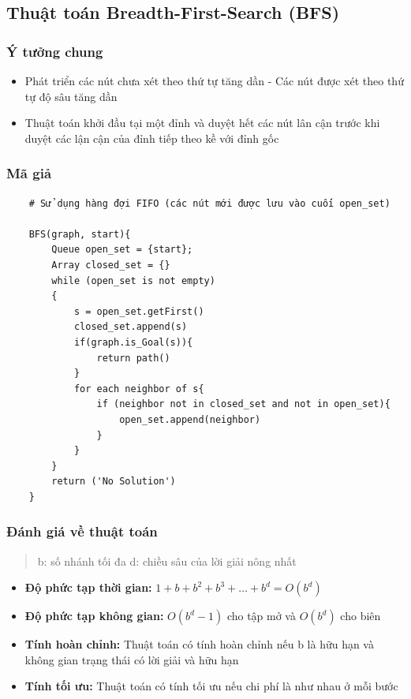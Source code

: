 \documentclass{article}
\begin{document}

\subsection{Thuật toán Breadth-First-Search (BFS)}
\subsubsection{Ý tưởng chung}
\begin{itemize}
    \item Phát triển các nút chưa xét theo thứ tự tăng dần - Các nút được xét theo thứ tự độ sâu tăng dần
    \item Thuật toán khởi đầu tại một đỉnh và duyệt hết các nút lân cận trước khi duyệt các lận cận của đỉnh tiếp theo kề với đỉnh gốc
\end{itemize}

\subsubsection{Mã giả}

\begin{verbatim}
    # Sử dụng hàng đợi FIFO (các nút mới được lưu vào cuối open_set)
    
    BFS(graph, start){
        Queue open_set = {start};
        Array closed_set = {}
        while (open_set is not empty)
        {
            s = open_set.getFirst()
            closed_set.append(s)    
            if(graph.is_Goal(s)){
                return path()
            }
            for each neighbor of s{
                if (neighbor not in closed_set and not in open_set){ 
                    open_set.append(neighbor)
                }   
            }
        } 
        return ('No Solution')
    }
\end{verbatim}

\subsubsection{Đánh giá về thuật toán}
\begin{quote}
    b: số nhánh tối đa
    d: chiều sâu của lời giải nông nhất
\end{quote}
\begin{itemize}
    \item \textbf{Độ phức tạp thời gian:} $1 + b + b^2 + b^3 + \dots + b^d = O(b^d)$
    \item \textbf{Độ phức tạp không gian:} $O(b^d-1)$ cho tập mở và $O(b^d)$ cho biên
    \item \textbf{Tính hoàn chỉnh:} Thuật toán có tính hoàn chỉnh nếu b là hữu hạn và không gian trạng thái có lời giải và hữu hạn 
    \item \textbf{Tính tối ưu:} Thuật toán có tính tối ưu nếu chi phí là như nhau ở mỗi bước
\end{itemize}
\end{document}
